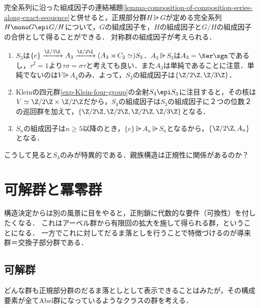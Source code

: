 \documentclass[uplatex,dvipdfmx]{jsreport}
\begin{document}
\begin{example}[対称群の組成因子]\label{exp-composition-series-of-symmetry-group}
    完全系列に沿った組成因子の連結補題\ref{lemma-composition-of-composition-series-along-exact-sequence}と併せると，正規部分群$H\rsub G$が定める完全系列$H\mono G\epi G/H$について，$G$の組成因子を，$H$の組成因子と$G/H$の組成因子の合併として得ることができる．
    対称群の組成因子が考えられる．
    \begin{enumerate}
        \item $S_3$は$\{e\}\xrightarrow{\Z/3\Z}A_3\xrightarrow{\Z/2\Z}(A_3\rtimes C_2\simeq )S_3$．$A_3\rsub S_3$は$A_3=\Ker\sgn$であるし，$\tau^2=1$より$\tau\sigma=\sigma\tau$と考えても良い．また$A_3$は単純であることに注意．単純でないのは$V\rsub A_4$のみ．よって，$S_3$の組成因子は$\{\Z/2\Z,\Z/3\Z\}$．
        \item Kleinの四元群\ref{exp-Klein-four-group}の全射$S_4\epi S_3$に注目すると，その核は$V\simeq\Z/2\Z\times\Z/2\Z$だから，$S_4$の組成因子は$S_3$の組成因子に２つの位数２の巡回群を加えて，$\{\Z/2\Z,\Z/2\Z,\Z/2\Z,\Z/3\Z\}$となる．
        \item $S_n$の組成因子は$n\ge 5$以降のとき，$\{e\}\rsub A_n\rsub S_n$となるから，$\{\Z/2\Z,A_n\}$となる．
    \end{enumerate}
    こうして見ると$S_4$のみが特異的である．親族構造は正規性に関係があるのか？
\end{example}

\section{可解群と冪零群}

\begin{tcolorbox}[colframe=ForestGreen, colback=ForestGreen!10!white,breakable,colbacktitle=ForestGreen!40!white,coltitle=black,fonttitle=\bfseries\sffamily,
title=]
    構造決定からは別の風景に目をやると，正則鎖に代数的な要件（可換性）を付したくなる．
    これはアーベル群から有限回の拡大を施して得られる群，ということになる．
    一方でこれに対してだるま落としを行うことで特徴づけるのが導来群＝交換子部分群である．
\end{tcolorbox}

\subsection{可解群}

\begin{tcolorbox}[colframe=ForestGreen, colback=ForestGreen!10!white,breakable,colbacktitle=ForestGreen!40!white,coltitle=black,fonttitle=\bfseries\sffamily,
title=]
    どんな群も正規部分群のだるま落としとして表示できることはみたが，その構成要素が全てAbel群になっているようなクラスの群を考える．
\end{tcolorbox}
\end{document}
